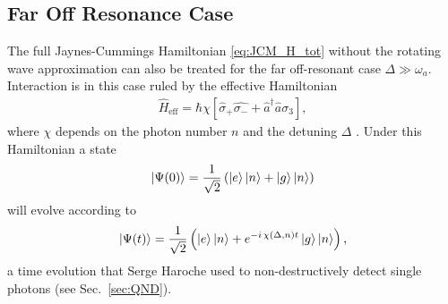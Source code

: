 \subsection{Far Off Resonance Case}
The full Jaynes-Cummings Hamiltonian \eqref{eq:JCM_H_tot} without the rotating
wave approximation can also be treated for the far off-resonant case
$\Delta\gg\omega_a$. Interaction is in this case ruled by the effective
Hamiltonian 
\begin{align}
  \label{eq:H_eff}
  \hat{H}_{\text{eff}} = \hbar \chi \left[\hat{\sigma}_+\hat{\sigma_-} +
  \hat{a}^\dagger \hat{a}\sigma_3 \right],
\end{align}
where $\chi$ depends on the photon number $n$ and the detuning $\Delta$
\cite{gerry2005introductory}. Under this Hamiltonian a state
\begin{align}
  \label{eq:psi_evol_0}
  \ket{\Psi(0)} = \frac{1}{\sqrt{2}} \left(\ket{e}\ket{n} +
  \ket{g}\ket{n}\right)
\end{align}
will evolve according to 
\begin{align}
  \label{eq:psi_evol_t}
  \ket{\Psi(t)} = \frac{1}{\sqrt{2}} \left( \ket{e}\ket{n} + e^{-i\,\chi
  (\Delta,n)t} \ket{g}\ket{n}\right),
\end{align}
a time evolution that Serge Haroche used to non-destructively detect single
photons (see Sec.~\ref{sec:QND}).
